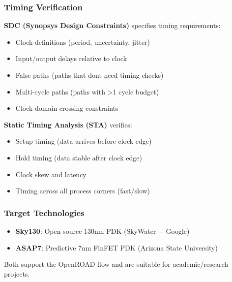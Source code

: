 \subsubsection{Timing Verification}\label{cr:status:roadmap:timing-verification}

\begin{record}

\textbf{SDC (Synopsys Design Constraints)} specifies timing
requirements:

\begin{itemize}
\tightlist
\item
  Clock definitions (period, uncertainty, jitter)
\item
  Input/\allowbreak{}output delays relative to clock
\item
  False paths (paths that don\textquotesingle t need timing checks)
\item
  Multi-cycle paths (paths with \textgreater1 cycle budget)
\item
  Clock domain crossing constraints
\end{itemize}

\textbf{Static Timing Analysis (STA)} verifies:

\begin{itemize}
\tightlist
\item
  Setup timing (data arrives before clock edge)
\item
  Hold timing (data stable after clock edge)
\item
  Clock skew and latency
\item
  Timing across all process corners (fast/\allowbreak{}slow)
\end{itemize}

\end{record}

\subsubsection{Target Technologies}\label{cr:status:roadmap:target-technologies}

\begin{record}

\begin{itemize}
\tightlist
\item
  \textbf{Sky130}: Open-source 130nm PDK (SkyWater + Google)
\item
  \textbf{ASAP7}: Predictive 7nm FinFET PDK (Arizona State University)
\end{itemize}

Both support the OpenROAD flow and are suitable for
academic/\allowbreak{}research projects.

\end{record}

